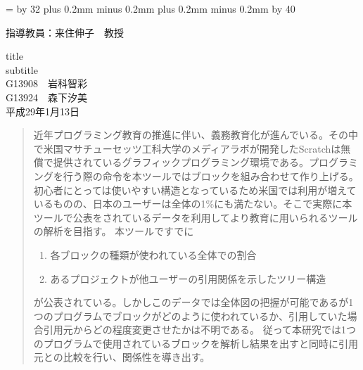 \documentclass[a4paper,10pt,onecolumn,oneside,openany]{jsbook}
\def\linesparpage#1{\baselineskip=\textheight
   \divide\baselineskip by #1}
\def\kcharparline#1{%
   \ifx\xkanjiskip\undefined%
   \jintercharskip 0mm plus 0.2mm minus 0.2mm
   \else
   \xkanjiskip 0mm plus 0.2mm minus 0.2mm
   \fi
   \settowidth{\textwidth}{あ}%
   \multiply\textwidth by #1}
\begin{document}
\linesparpage{32} %
\kcharparline{40} %
\begin{titlepage}
\begin{flushright}
{\large
指導教員：来住伸子　教授 \\ %
}
\end{flushright}
\begin{center}
\vspace{150truept}
{\huge title}\\ %
\vspace{10truept}
{\Large subtitle}\\ %
\vspace{50truept}
{\huge G13908　岩科智彩}\\ %
\vspace{10truept}
{\huge G13924　森下汐美}\\ %
\vspace{50truept}
{\huge 平成29年1月13日}\\ %
\end{center}
\end{titlepage}

\frontmatter
\begin{abstract} %
近年プログラミング教育の推進に伴い、義務教育化が進んでいる。その中で米国マサチューセッツ工科大学のメディアラボが開発したScratchは無償で提供されているグラフィックプログラミング環境である。プログラミングを行う際の命令を本ツールではブロックを組み合わせて作り上げる。初心者にとっては使いやすい構造となっているため米国では利用が増えているものの、日本のユーザーは全体の1\%にも満たない。そこで実際に本ツールで公表をされているデータを利用してより教育に用いられるツールの解析を目指す。
本ツールですでに
\begin{enumerate}
  \item 各ブロックの種類が使われている全体での割合
  \item あるプロジェクトが他ユーザーの引用関係を示したツリー構造
\end{enumerate}
が公表されている。しかしこのデータでは全体図の把握が可能であるが1つのプログラムでブロックがどのように使われているか、引用していた場合引用元からどの程度変更させたかは不明である。
従って本研究では1つのプログラムで使用されているブロックを解析し結果を出すと同時に引用元との比較を行い、関係性を導き出す。
\end{abstract}

\tableofcontents
%
%
\mainmatter
%
\end{document}

